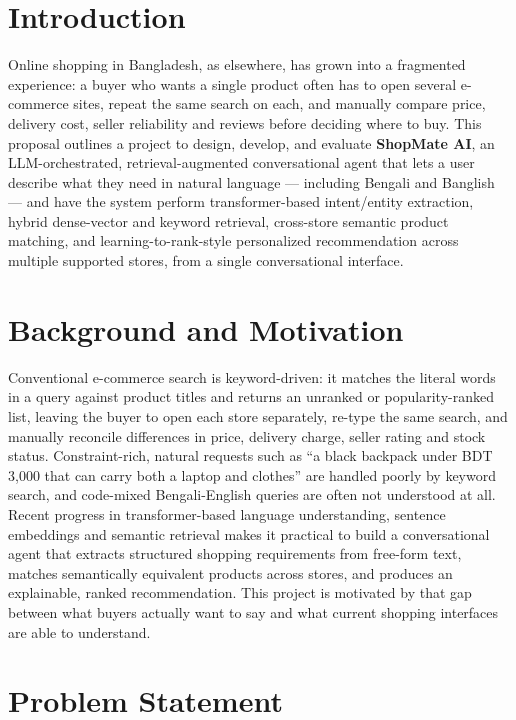 \documentclass[12pt,a4paper]{article}
\begin{document}
\section{Introduction}

Online shopping in Bangladesh, as elsewhere, has grown into a fragmented experience: a buyer who wants a single
product often has to open several e-commerce sites, repeat the same search on each, and manually compare price,
delivery cost, seller reliability and reviews before deciding where to buy. This proposal outlines a project to
design, develop, and evaluate \textbf{ShopMate AI}, an LLM-orchestrated, retrieval-augmented conversational agent
that lets a user describe what they need in natural language --- including Bengali and Banglish --- and have the
system perform transformer-based intent/entity extraction, hybrid dense-vector and keyword retrieval, cross-store
semantic product matching, and learning-to-rank-style personalized recommendation across multiple supported
stores, from a single conversational interface.

\section{Background and Motivation}

Conventional e-commerce search is keyword-driven: it matches the literal words in a query against product titles
and returns an unranked or popularity-ranked list, leaving the buyer to open each store separately, re-type the
same search, and manually reconcile differences in price, delivery charge, seller rating and stock status.
Constraint-rich, natural requests such as ``a black backpack under BDT 3,000 that can carry both a laptop and
clothes'' are handled poorly by keyword search, and code-mixed Bengali-English queries are often not understood at
all. Recent progress in transformer-based language understanding, sentence embeddings and semantic retrieval makes
it practical to build a conversational agent that extracts structured shopping requirements from free-form text,
matches semantically equivalent products across stores, and produces an explainable, ranked recommendation. This
project is motivated by that gap between what buyers actually want to say and what current shopping interfaces are
able to understand.

\section{Problem Statement}
\end{document}
